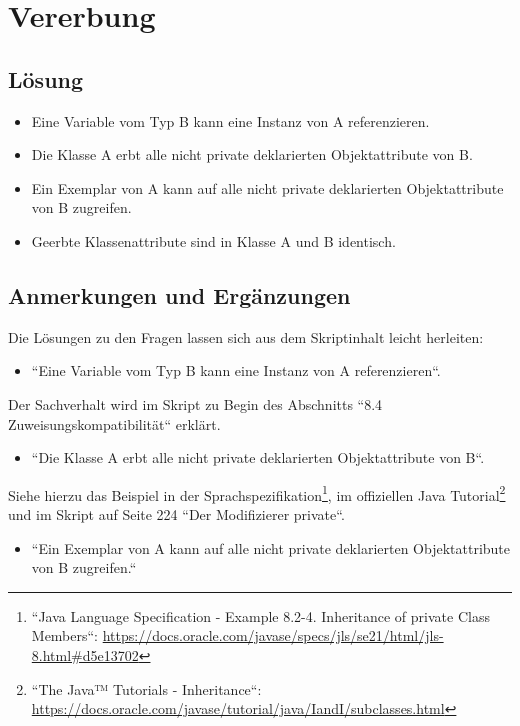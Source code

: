 \chapter{Vererbung}

\section*{Lösung}

\begin{itemize}
    \item Eine Variable vom Typ B kann eine Instanz von A referenzieren.
    \item Die Klasse A erbt alle nicht private deklarierten Objektattribute von B.
    \item Ein Exemplar von A kann auf alle nicht private deklarierten Objektattribute von B zugreifen.
    \item Geerbte Klassenattribute sind in Klasse A und B identisch.
\end{itemize}


\section*{Anmerkungen und Ergänzungen}

Die Lösungen zu den Fragen lassen sich aus dem Skriptinhalt leicht herleiten:

\begin{itemize}
    \item ``Eine Variable vom Typ B kann eine Instanz von A referenzieren``.
\end{itemize}

Der Sachverhalt wird im Skript zu Begin des Abschnitts ``8.4 Zuweisungskompatibilität`` erklärt.

\begin{itemize}
    \item ``Die Klasse A erbt alle nicht private deklarierten Objektattribute von B``.
\end{itemize}
Siehe hierzu das Beispiel in der Sprachspezifikation\footnote{``Java Language Specification - Example 8.2-4. Inheritance of private Class Members``: \url{https://docs.oracle.com/javase/specs/jls/se21/html/jls-8.html#d5e13702}},
im offiziellen Java Tutorial\footnote{``The Java™ Tutorials - Inheritance``: \url{https://docs.oracle.com/javase/tutorial/java/IandI/subclasses.html}}
und im Skript auf Seite 224 ``Der Modifizierer private``.

\begin{itemize}
    \item ``Ein Exemplar von A kann auf alle nicht private deklarierten Objektattribute von B zugreifen.``
\end{itemize}

